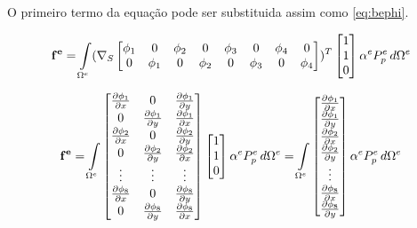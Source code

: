 O primeiro termo da equação pode ser substituida assim como \eqref{eq:bephi}.


\begin{equation}
   \mathbf{ f^e } = \omeeint{(\sopnabla \begin{bmatrix}
                        \phi_1 & 0      & \phi_2 & 0 & \phi_3 & 0 & \phi_4 & 0\\
                        0      & \phi_1 & 0 & \phi_2 & 0 & \phi_3 & 0 & \phi_4
                    \end{bmatrix} ) ^ T \begin{bmatrix}
                    1\\1\\0
                    \end{bmatrix} \alpha^e P^e_p}
\end{equation}

\begin{equation} \label{eq:cargafinal}
   \mathbf{ f^e } = \omeeint{\begin{bmatrix}
    \dx[\phi_1] & 0           & \dy[\phi_1] \\
    0           & \dy[\phi_1] & \dx[\phi_1] \\
    \dx[\phi_2] & 0           & \dy[\phi_2] \\
    0           & \dy[\phi_2] & \dx[\phi_2] \\
    \vdots      & \vdots & \vdots      \\

    \dx[\phi_8] & 0           & \dy[\phi_8] \\
    0           & \dy[\phi_8] & \dx[\phi_8] \\

    \end{bmatrix} \begin{bmatrix}  1\\1\\0 \end{bmatrix} \alpha^e P^e_p }
    = \omeeint{\begin{bmatrix}
      \dx[\phi_1] \\
      \dy[\phi_1] \\
      \dx[\phi_2] \\
      \dy[\phi_2] \\
      \vdots      \\
      \dx[\phi_8] \\
      \dy[\phi_8] \\
    \end{bmatrix} \alpha^e P^e_p }
\end{equation}

